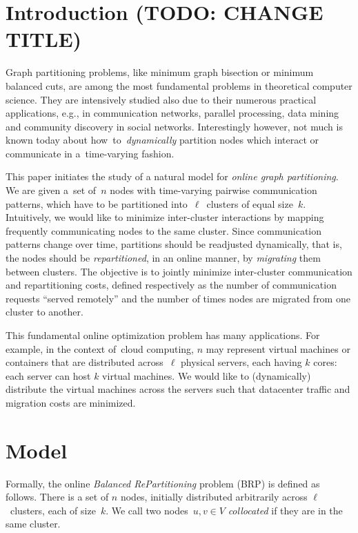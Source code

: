 
\section{Introduction (TODO: CHANGE TITLE)}

Graph partitioning problems, like minimum graph bisection or minimum balanced
cuts, are among the most fundamental problems in theoretical computer science.
They are intensively studied also due to their numerous practical
applications, e.g., in communication networks, parallel processing, data
mining and community discovery in social networks. Interestingly however, not
much is known today about how~to~\emph{dynamically} partition nodes which
interact or communicate in a~time-varying fashion.

This paper initiates the study of a natural model for \emph{online graph
partitioning}. We are given a~set of~$n$ nodes with time-varying pairwise
communication patterns, which have to be partitioned into~$\ell$~clusters of
equal size~$k$. Intuitively, we would like to minimize inter-cluster
interactions by mapping frequently communicating nodes to the same cluster.
Since communication patterns change over time, partitions should be
readjusted dynamically, that is, the nodes should be \emph{repartitioned}, in
an online manner, by \emph{migrating} them between clusters. The objective is
to jointly minimize inter-cluster communication and repartitioning costs,
defined respectively as the number of communication requests ``served
remotely'' and the number of times nodes are migrated from one cluster to
another.

This fundamental online optimization problem has many applications. For
example, in the context of~cloud computing, $n$ may represent virtual machines
or containers that are distributed across~$\ell$ physical servers, each having
$k$ cores: each server can host $k$ virtual machines. We would like to
(dynamically) distribute the virtual machines across the servers such that
datacenter traffic and migration costs are minimized.




\section{Model}

Formally, the online \emph{Balanced RePartitioning} problem (BRP) is defined as
follows. There is a set of $n$ nodes, initially distributed arbitrarily
across $\ell$~clusters, each of size~$k$. We call two nodes~$u,v\in V$
\emph{collocated} if they are in the same cluster.

